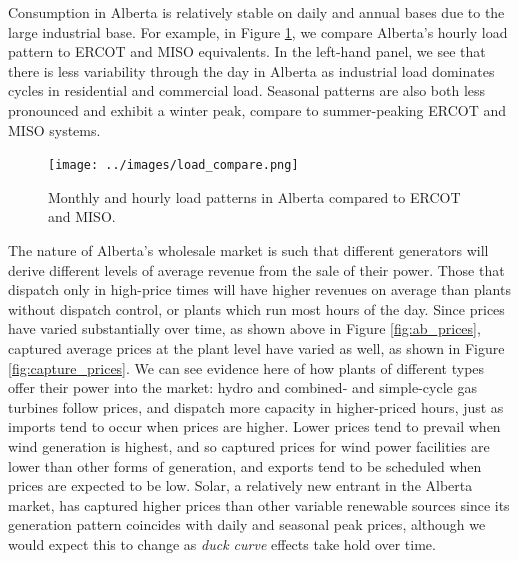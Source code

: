 \documentclass[12pt]{article}
\begin{document}
Consumption in Alberta is relatively stable on daily and annual bases due to the large industrial base. For example, in Figure \ref{fig:load_pattern}, we compare Alberta's hourly load pattern to ERCOT and MISO equivalents. In the left-hand panel, we see that there is less variability through the day in Alberta as industrial load dominates cycles in residential and commercial load. Seasonal patterns are also both less pronounced and exhibit a winter peak, compare to summer-peaking ERCOT and MISO systems.

\begin{figure}[!h]%
	\centering \vspace{-.25cm} \texttt{[image: ../images/load\_compare.png]}
\vspace{-0.75cm}	\caption{Monthly and hourly load patterns in Alberta compared to ERCOT and MISO.}
\label{fig:load_pattern}
\end{figure}

The nature of Alberta's wholesale market is such that different generators will derive different levels of average revenue from the sale of their power. Those that dispatch only in high-price times will have higher revenues on average than plants without dispatch control, or plants which run most hours of the day. Since prices have varied substantially over time, as shown above in Figure \ref{fig:ab_prices}, captured average prices at the plant level have varied as well, as shown in Figure \ref{fig:capture_prices}. We can see evidence here of how plants of different types offer their power into the market: hydro and combined- and simple-cycle gas turbines follow prices, and dispatch more capacity in higher-priced hours, just as imports tend to occur when prices are higher. Lower prices tend to prevail when wind generation is highest, and so captured prices for wind power facilities are lower than other forms of generation, and exports tend to be scheduled when prices are expected to be low. Solar, a relatively new entrant in the Alberta market, has captured higher prices than other variable renewable sources since its generation pattern coincides with daily and seasonal peak prices, although we would expect this to change as \emph{duck curve} effects take hold over time.
\end{document}
